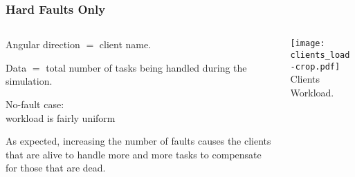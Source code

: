\begin{frame}
\frametitle{Hard Faults Only}
%
\begin{columns}
\begin{column}{0.6\textwidth}
\bi
\item Angular direction $=$ client name. 
\item Data $=$ total number of tasks being handled during the simulation.
\item No-fault case: \\workload is fairly uniform 
\item As expected, increasing the number of faults causes 
the clients that are alive to handle more and more 
tasks to compensate for those that are dead.
\ei
\end{column}
%
\begin{column}{0.5\textwidth}
\begin{center}
\texttt{[image: clients\_load-crop.pdf]}\\
{Clients Workload.}
\end{center}
\end{column}
\end{columns}
%
\end{frame}






